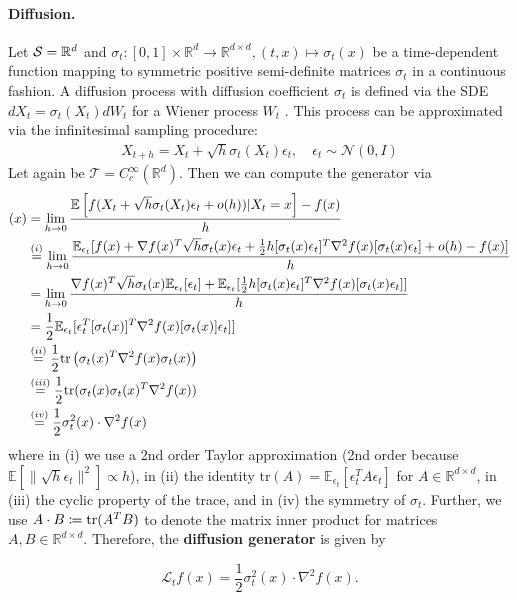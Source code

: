 \documentclass{fairmeta}
\newcommand{\highlight}[1]{{\color{metablue} \textbf{#1}}}
\numberwithin{equation}{section}
\begin{document}
\paragraph{Diffusion.} Let ${\mathcal{S}}=\mathbb{R}^d$ and $\sigma_t:[0,1]\times \mathbb{R}^d\to \mathbb{R}^{d\times d}, (t,x)\mapsto \sigma_t(x)$  be a time-dependent function mapping to symmetric positive semi-definite matrices $\sigma_t$ in a continuous fashion. A diffusion process with diffusion coefficient $\sigma_t$ is defined via the SDE $dX_t=\sigma_t(X_t)dW_t$ for a Wiener process $W_t$ \citep{oksendal2003stochastic}. This process can be approximated via the infinitesimal sampling procedure: 
\begin{align}
    X_{t+h} = X_{t} + \sqrt{h }\sigma_t(X_t)\epsilon_t,\quad \epsilon_t\sim\mathcal{N}(0,I)
\end{align}
Let again be $\mathcal{T}=C_{c}^\infty(\mathbb{R}^d)$. Then we can compute the generator via
\begin{align}
    [\gL_t f](x) &=\lim_{h\too 0} \frac{\E\brac{f(X_{t} + \sqrt{h} \sigma_t(X_t)\epsilon_t+o(h))|X_t=x}-f(x)}{h}\\
    &\overset{(i)}{=}\lim_{h\too 0} \frac{\mathbb{E}_{\epsilon_t}[f(x)+\nabla f(x)^T\sqrt{h}\sigma_t(x)\epsilon_t+\frac{1}{2}h[\sigma_t(x)\epsilon_t]^T\nabla^2f(x)[\sigma_t(x)\epsilon_t]+o(h)-f(x)]}{h}\\
    &=\lim_{h\too 0} \frac{\nabla f(x)^T\sqrt{h}\sigma_t(x)\mathbb{E}_{\epsilon_t}[\epsilon_t]+\mathbb{E}_{\epsilon_t}[\frac{1}{2}h[\sigma_t(x)\epsilon_t]^T\nabla^2f(x)[\sigma_t(x)\epsilon_t]]}{h}\\
    &=\frac{1}{2}\mathbb{E}_{\epsilon_t}[\epsilon_t^T[\sigma_t(x)]^T\nabla^2f(x)[\sigma_t(x)]\epsilon_t]]\\
    &\overset{(ii)}{=}\frac{1}{2}\text{tr}\left(\sigma_t(x)^T\nabla^2f(x)\sigma_t(x)\right)\\
    &\overset{(iii)}{=}\frac{1}{2}\text{tr}(\sigma_t(x)\sigma_t(x)^T\nabla^2f(x))\\
    &\overset{(iv)}{=}\frac{1}{2}\sigma_t^2(x)\cdot \nabla^2f(x)
\end{align}
where in (i) we use a 2nd order Taylor approximation (2nd order because $\mathbb{E}[\|\sqrt{h}\epsilon_t\|^2]\propto h$), in (ii) the identity $\text{tr}(A)=\mathbb{E}_{\epsilon_t}[\epsilon_t^TA\epsilon_t]$ for $A\in\mathbb{R}^{d\times d}$, in (iii) the cyclic property of the trace, and in (iv) the symmetry of $\sigma_t$. Further, we use $A\cdot B\coloneqq\text{tr}(A^TB)$ to denote the matrix inner product for matrices $A,B\in\mathbb{R}^{d\times d}$. Therefore, the \highlight{diffusion generator} is given by
\begin{myframe}
\begin{equation}
\label{eq:diffusion_generator}
  \mathcal{L}_t f(x) =\frac{1}{2}\sigma_t^2(x)\cdot \nabla^2f(x).
\end{equation}
\end{myframe}
\end{document}
